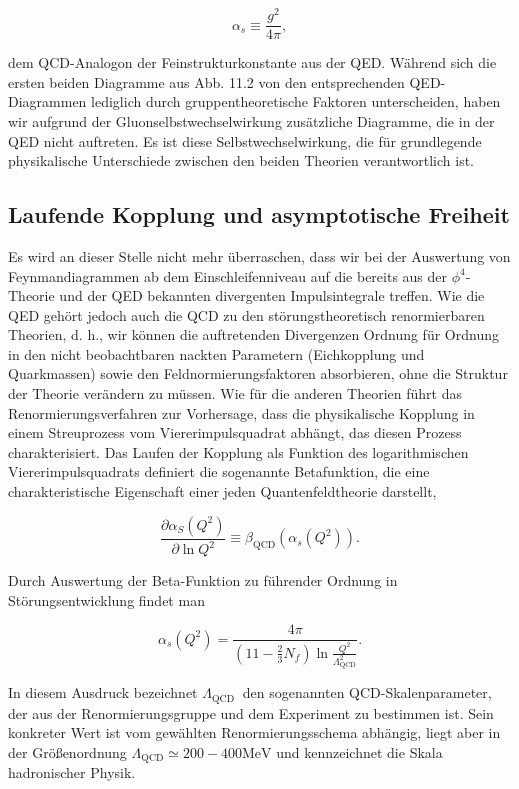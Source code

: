 \documentclass[10pt, letterpaper]{article}
\begin{document}
$$
\alpha_{s} \equiv \frac{g^{2}}{4 \pi},
$$

dem QCD-Analogon der Feinstrukturkonstante aus der QED. Während sich die ersten beiden Diagramme aus Abb. 11.2 von den entsprechenden QED-Diagrammen lediglich durch gruppentheoretische Faktoren unterscheiden, haben wir aufgrund der Gluonselbstwechselwirkung zusätzliche Diagramme, die in der QED nicht auftreten. Es ist diese Selbstwechselwirkung, die für grundlegende physikalische Unterschiede zwischen den beiden Theorien verantwortlich ist.

\subsection*{Laufende Kopplung und asymptotische Freiheit}
Es wird an dieser Stelle nicht mehr überraschen, dass wir bei der Auswertung von Feynmandiagrammen ab dem Einschleifenniveau auf die bereits aus der $\phi^{4}$-Theorie und der QED bekannten divergenten Impulsintegrale treffen. Wie die QED gehört jedoch auch die QCD zu den störungstheoretisch renormierbaren Theorien, d. h., wir können die auftretenden Divergenzen Ordnung für Ordnung in den nicht beobachtbaren nackten Parametern (Eichkopplung und Quarkmassen) sowie den Feldnormierungsfaktoren absorbieren, ohne die Struktur der Theorie verändern zu müssen. Wie für die anderen Theorien führt das Renormierungsverfahren zur Vorhersage, dass die physikalische Kopplung in einem Streuprozess vom Viererimpulsquadrat abhängt, das diesen Prozess charakterisiert. Das Laufen der Kopplung als Funktion des logarithmischen Viererimpulsquadrats definiert die sogenannte Betafunktion, die eine charakteristische Eigenschaft einer jeden Quantenfeldtheorie darstellt,

$$
\frac{\partial \alpha_{S}\left(Q^{2}\right)}{\partial \ln Q^{2}} \equiv \beta_{\mathrm{QCD}}\left(\alpha_{s}\left(Q^{2}\right)\right) .
$$

Durch Auswertung der Beta-Funktion zu führender Ordnung in Störungsentwicklung findet man

$$
\alpha_{s}\left(Q^{2}\right)=\frac{4 \pi}{\left(11-\frac{2}{3} N_{f}\right) \ln \frac{Q^{2}}{\Lambda_{\mathrm{QCD}}^{2}}} .
$$

In diesem Ausdruck bezeichnet $\Lambda_{\text {QCD }}$ den sogenannten QCD-Skalenparameter, der aus der Renormierungsgruppe und dem Experiment zu bestimmen ist. Sein konkreter Wert ist vom gewählten Renormierungsschema abhängig, liegt aber in der Größenordnung $\Lambda_{\mathrm{QCD}} \simeq 200-400 \mathrm{MeV}$ und kennzeichnet die Skala hadronischer Physik.
\end{document}
